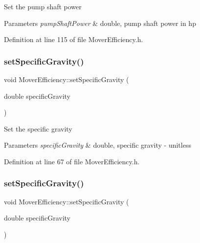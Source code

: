 Set the pump shaft power 
\begin{DoxyParams}{Parameters}
{\em pump\+Shaft\+Power} & double, pump shaft power in hp \\
\hline
\end{DoxyParams}


Definition at line 115 of file Mover\+Efficiency.\+h.

\mbox{\label{class_mover_efficiency_aed095f525636345bdfebe76774afa2d4}} 
\subsubsection{\texorpdfstring{set\+Specific\+Gravity()}{setSpecificGravity()}\hspace{0.1cm}{\footnotesize\ttfamily [1/3]}}
{\footnotesize\ttfamily void Mover\+Efficiency\+::set\+Specific\+Gravity (\begin{DoxyParamCaption}\item[{double}]{specific\+Gravity }\end{DoxyParamCaption})\hspace{0.3cm}{\ttfamily [inline]}}

Set the specific gravity 
\begin{DoxyParams}{Parameters}
{\em specific\+Gravity} & double, specific gravity -\/ unitless \\
\hline
\end{DoxyParams}


Definition at line 67 of file Mover\+Efficiency.\+h.

\mbox{\label{class_mover_efficiency_aed095f525636345bdfebe76774afa2d4}} 
\subsubsection{\texorpdfstring{set\+Specific\+Gravity()}{setSpecificGravity()}\hspace{0.1cm}{\footnotesize\ttfamily [2/3]}}
{\footnotesize\ttfamily void Mover\+Efficiency\+::set\+Specific\+Gravity (\begin{DoxyParamCaption}\item[{double}]{specific\+Gravity }\end{DoxyParamCaption})\hspace{0.3cm}{\ttfamily [inline]}}

